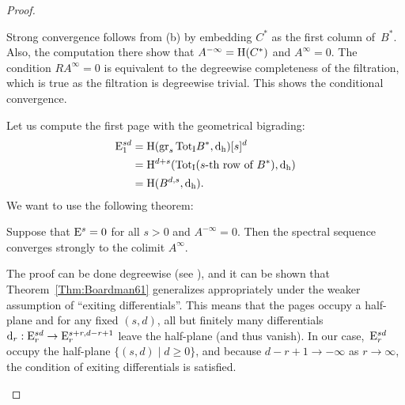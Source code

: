 \documentclass[\MainFolder/Text.tex]{subfiles}
\begin{document}
\begin{proof}
\begin{ProofList}
\item Strong convergence follows from (b) by embedding $C^*$ as the first column of~$B^*$. Also, the computation there show that $A^{-\infty} = \mathrm{H}(C^*)$ and $A^\infty = 0$. The condition $RA^\infty = 0$ is equivalent to the degreewise completeness of the filtration, which is true as the filtration is degreewise trivial. This shows the conditional convergence.
\item Let us compute the first page with the geometrical bigrading:
\begin{align*}
\mathrm{E}_1^{sd} & = \mathrm{H}(\operatorname{\mathrm{gr}}_s {\mathrm{Tot}_{\mathrm{I}}} B^*,\mathrm{d}_{\mathrm{h}})[s]^d \\
 &= \mathrm{H}^{d+s}({\mathrm{Tot}_{\mathrm{I}}}(s\text{-th row of }B^*),\mathrm{d}_{\mathrm{h}}) \\
 &= \mathrm{H}(B^{d,s},\mathrm{d}_{\mathrm{h}}).
\end{align*}
We want to use the following theorem:
\begin{ProofTheorem}\label{Thm:Boardman61}
Suppose that $\mathrm{E}^s = 0$ for all $s>0$ and $A^{-\infty} = 0$. Then the spectral sequence converges strongly to the colimit $A^{\infty}$.
\end{ProofTheorem}
The proof can be done degreewise (see \cite{MO336781}), and it can be shown that Theorem~\ref{Thm:Boardman61} generalizes appropriately under the weaker assumption of ``exiting differentials''. This means that the pages occupy a half-plane and for any fixed $(s,d)$, all but finitely many differentials $\mathrm{d}_r: \mathrm{E}_r^{sd} \rightarrow \mathrm{E}_{r}^{s+r,d-r+1}$  leave the half-plane (and thus vanish). In our case,~$\mathrm{E}_r^{sd}$ occupy the half-plane $\{(s,d)\mid d\ge 0\}$, and because $d-r+1 \to -\infty$ as $r\to \infty$, the condition of exiting differentials is satisfied.


\end{ProofList}
\end{proof}
\end{document}
